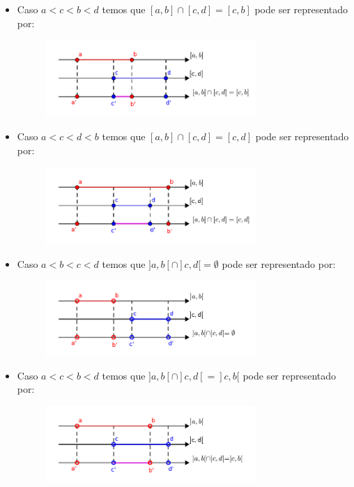 \begin{itemize}
 \item Caso $a< c< b< d$ temos que $[a, b] \cap [c, d]= [c, b]$ pode ser representado por:
  \begin{figure}[H]
 \centering
 \includegraphics[width=8cm]{../Topicos/Figuras/intersecaoacbd.pdf}
 \end{figure}
 
  \item Caso $a< c< d< b$ temos que $[a, b] \cap [c, d]= [c, d]$ pode ser representado por:
  \begin{figure}[H]
 \centering
 \includegraphics[width=8cm]{../Topicos/Figuras/intersecaoacdb.pdf}
 \end{figure}
 
 \item Caso $a< b< c< d$ temos que $]a, b[ \cap ]c, d[ = \emptyset$ pode ser representado por:
  \begin{figure}[H]
 \centering
 \includegraphics[width=8cm]{../Topicos/Figuras/intersecao-a-b-c-d.pdf}
 \end{figure}
 
 \item Caso $a< c< b< d$ temos que $]a, b[ \cap ]c, d[= ]c, b[$ pode ser representado por:
  \begin{figure}[H]
 \centering
 \includegraphics[width=8cm]{../Topicos/Figuras/intersecaoa-c-bd.pdf}
 \end{figure}
 

\end{itemize}
